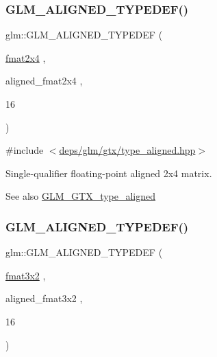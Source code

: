 \subsubsection{\texorpdfstring{G\+L\+M\+\_\+\+A\+L\+I\+G\+N\+E\+D\+\_\+\+T\+Y\+P\+E\+D\+E\+F()}{GLM\_ALIGNED\_TYPEDEF()}\hspace{0.1cm}{\footnotesize\ttfamily [174/209]}}
{\footnotesize\ttfamily glm\+::\+G\+L\+M\+\_\+\+A\+L\+I\+G\+N\+E\+D\+\_\+\+T\+Y\+P\+E\+D\+EF (\begin{DoxyParamCaption}\item[{\hyperlink{group__gtc__type__precision_gabaf7537f5284456254b1da1cd6fd2b78}{fmat2x4}}]{,  }\item[{aligned\+\_\+fmat2x4}]{,  }\item[{16}]{ }\end{DoxyParamCaption})}



{\ttfamily \#include $<$\hyperlink{gtx_2type__aligned_8hpp}{deps/glm/gtx/type\+\_\+aligned.\+hpp}$>$}

Single-\/qualifier floating-\/point aligned 2x4 matrix. \begin{DoxySeeAlso}{See also}
\hyperlink{group__gtx__type__aligned}{G\+L\+M\+\_\+\+G\+T\+X\+\_\+type\+\_\+aligned} 
\end{DoxySeeAlso}
\mbox{\label{group__gtx__type__aligned_ga4b4e181cd041ba28c3163e7b8074aef0}} 
\subsubsection{\texorpdfstring{G\+L\+M\+\_\+\+A\+L\+I\+G\+N\+E\+D\+\_\+\+T\+Y\+P\+E\+D\+E\+F()}{GLM\_ALIGNED\_TYPEDEF()}\hspace{0.1cm}{\footnotesize\ttfamily [175/209]}}
{\footnotesize\ttfamily glm\+::\+G\+L\+M\+\_\+\+A\+L\+I\+G\+N\+E\+D\+\_\+\+T\+Y\+P\+E\+D\+EF (\begin{DoxyParamCaption}\item[{\hyperlink{group__gtc__type__precision_gaed9c8fe9d2e094bf3bc7c606bbae1a6b}{fmat3x2}}]{,  }\item[{aligned\+\_\+fmat3x2}]{,  }\item[{16}]{ }\end{DoxyParamCaption})}



